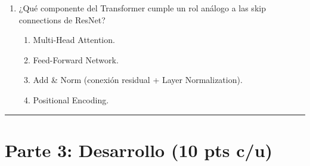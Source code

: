 \documentclass[12pt,a4paper]{article}
\begin{document}
\begin{enumerate}[label=\arabic*)]
    \item ¿Qué componente del Transformer cumple un rol análogo a las skip connections de ResNet?
    \begin{enumerate}[label=\Alph*)]
        \item Multi-Head Attention.
        \item Feed-Forward Network.
        \item Add \& Norm (conexión residual + Layer Normalization).
        \item Positional Encoding.
    \end{enumerate}
\end{enumerate}

\vspace{0.5cm}
\hrule
\vspace{0.5cm}

\section*{Parte 3: Desarrollo (10 pts c/u)}
\end{document}
